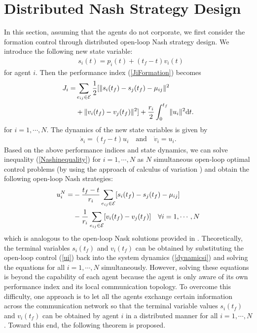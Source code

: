 \documentclass[letterpaper, 10 pt, conference,onecolumn]{ieeeconf}  %
\begin{document}
\section{Distributed Nash Strategy Design}\label{mainresult1}
In this section, assuming that the agents do not corporate, we first consider the formation control through distributed open-loop Nash strategy design. We introduce the following new state variable:
{\begin{align}
&s_{i}(t)=p_i(t)+(t_f-t)v_i(t)\label{si}
\end{align}}
for agent $i$. {Then} the performance index (\ref{JiFormation}) becomes
\begin{align}
J_i=&\sum_{e_{ij}\in\mathcal{E}} \frac{1}{2}[\|s_{i}(t_f)-s_{j}(t_f)-\mu_{ij}\|^2\notag\\
&+ \|v_{i}(t_f)-v_{j}(t_f)\|^2]+\frac{r_i}{2} \int^{t_f}_0 \|u_i\|^2  \mbox{d}t.\label{JrecedingreFormation}
\end{align}
for $i=1,\cdots,N$. The dynamics of the new state variables is given by
\begin{align}
\dot{s}_{i}=(t_f-t)u_i \quad\mbox{and}\quad\dot{v}_{i}= u_i.\label{dynamicsi}
\end{align}
{Based on the above performance indices and state dynamics, we can solve inequality (\ref{Nashinequality}) for $i=1, \cdots, N$ as $N$ simultaneous open-loop optimal control problems (by using the approach of calculus of variation \cite{Bryson}) and obtain the following open-loop Nash strategies:}
\begin{align}
u^N_i=& -\frac{t_f-t}{r_i}\sum_{e_{ij}\in\mathcal{E}} [s_{i}(t_f)-s_{j}(t_f)-\mu_{ij}] \notag\\&-\frac{1}{r_i}\sum_{e_{ij}\in\mathcal{E}} [v_{i}(t_f)-v_{j}(t_f)]\quad\forall i=1,\cdots,N
\label{ui}
\end{align}
{which is analogous to the open-loop Nask solutions provided in \cite{Ho}}. Theoretically, the terminal variables $s_i(t_f)$ and $v_i(t_f)$ can be obtained by substituting the open-loop control (\ref{ui}) back into the system dynamics (\ref{dynamicsi}) and solving the equations for all $i=1,\cdots,N$ simultaneously. However, solving these equations is beyond the capability of each agent because the agent is only aware of its own performance index and its local communication topology. To overcome this difficulty, one approach is to let all the agents exchange certain information across the communication network so that the terminal variable values $s_i(t_f)$ and $v_i(t_f)$ can be obtained by agent $i$ in a distributed manner for all $i=1,\cdots,N$. Toward this end, the following theorem is proposed.
\end{document}
